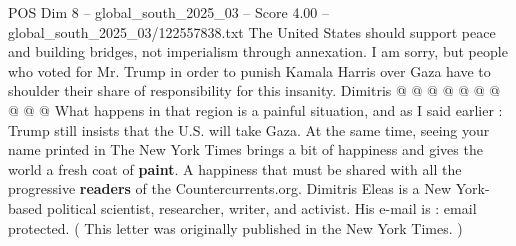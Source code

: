 \begin{textsample}{POS Dim 8 – global\_south\_2025\_03 – Score 4.00 – global\_south\_2025\_03/122557838.txt}
The United States should support peace and building bridges, not imperialism through annexation.
I am sorry, but people who voted for Mr.
Trump in order to punish Kamala Harris over Gaza have to shoulder their share of responsibility for this insanity.
Dimitris @ @ @ @ @ @ @ @ @ @ What happens in that region is a painful situation, and as I said earlier : Trump still insists that the U.S. will take Gaza.
At the same time, seeing your name printed in The New York Times brings a bit of happiness and gives the world a fresh coat of \textbf{paint}.
A happiness that must be shared with all the progressive \textbf{readers} of the Countercurrents.org.
Dimitris Eleas is a New York-based political scientist, researcher, writer, and activist.
His e-mail is : email protected. ( This letter was originally published in the New York Times. )

\end{textsample}
